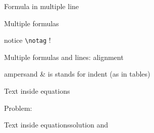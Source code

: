 \begin{frame}[fragile]{Formula in multiple line\magicPage}\relax
{}

    \cprotect{}

\end{frame}


\begin{frame}[fragile]{Multiple formulas\magicPage}\relax

    \cprotect{}

\incPause
notice \lstinline[basicstyle=\tt\normalsize]|\notag| !

\cprotect{}

\end{frame}

\begin{frame}[fragile]{Multiple formulas and lines: alignment\magicPage}\relax
\cprotect{}
\cprotect{}


ampersand {\csk \&} is stands for indent (as in tables)
\cprotect{}
\end{frame}

\begin{frame}[fragile, t]{Text inside equations\magicPage}\relax

\cprotect{}

Problem:
\cprotect{}

\end{frame}
\begin{frame}[fragile]{Text inside equations\magicPage}{solution}\relax
\cprotect{}
\ccol{\text} and \ccol{\intertext}
\end{frame}

